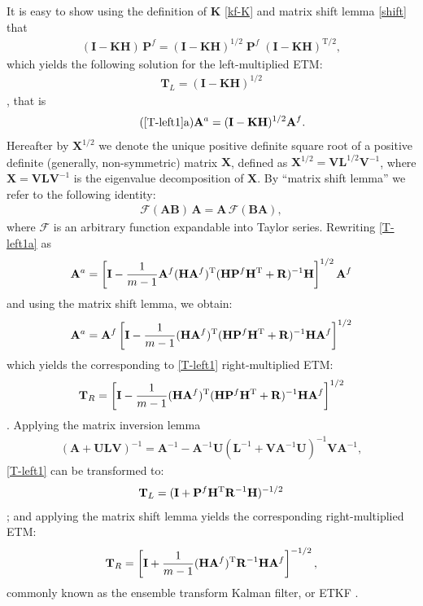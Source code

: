 \documentclass[11pt]{report}
\newcommand{\mb} {\mathbf}
\newcommand{\T}{^{\tiny \mathrm T}}
\newcommand{\TS}{^{{\mathrm T}/2}}
\begin{document}
It is easy to show using the definition of $\mb K$ \eqref{kf-K} and matrix shift lemma \eqref{shift} that 
\begin{align*}
    (\mb I - \mb K \mb H) \, \mb P^f = (\mb I - \mb K \mb H)^{1/2} \; \mb P^f \; (\mb I - \mb K \mb H)\TS,
\end{align*}
which yields the following solution for the left-multiplied ETM:
\begin{align}
  \label{T-left1}
  \mb T_L = (\mb I - \mb K \mb H)^{1/2}
\end{align}
\citep{sak08b}, that is
\begin{align}
  \tag{\ref{T-left1}a}
  \label{T-left1a}
  \mb A^a =  (\mb I - \mb K \mb H)^{1/2} \mb A^f.
\end{align}
Hereafter by $\mb X^{1/2}$ we denote the unique positive definite square root of a positive definite (generally, non-symmetric) matrix $\mb X$, defined as $\mb X^{1/2} = \mb V \mb L^{1/2} \mb V^{-1}$, where $\mb X = \mb V \mb L \mb V^{-1}$ is the eigenvalue decomposition of $\mb X$.
By ``matrix shift lemma'' we refer to the following identity:
\begin{align}
  \label{shift}
  \mathcal F(\mb A \mb B) \, \mb A = \mb A \, \mathcal F(\mb B \mb A),
\end{align}
where $\mathcal F$ is an arbitrary function expandable into Taylor series.
Rewriting \eqref{T-left1a} as
\begin{align*}
  \mb A^a = \left[ \mb I - \frac{1}{m-1} \mb A^f (\mb H \mb A^f)\T  (\mb H \mb P^f \mb H\T + \mb R)^{-1} \mb H \right]^{1/2} \mb A^f
\end{align*}
and using the matrix shift lemma, we obtain:
\begin{align*}
  \mb A^a = \mb A^f \left[ \mb I - \frac{1}{m-1} (\mb H \mb A^f)\T  (\mb H \mb P^f \mb H\T + \mb R)^{-1} \mb H \mb A^f \right]^{1/2}
\end{align*}
which yields the corresponding to \eqref{T-left1} right-multiplied ETM:
\begin{align}
  \label{T-right1}
  \mb T_R = \left[ \mb I -  \frac{1}{m-1} (\mb H \mb A^f)\T  (\mb H \mb P^f \mb H\T + \mb R)^{-1} \mb H \mb A^f \right]^{1/2}
\end{align}
\citep{eve04a}.
Applying the matrix inversion lemma
\begin{align}
  \label{inv}
  (\mb A + \mb U \mb L \mb V)^{-1} = \mb A^{-1} - \mb A^{-1} \mb U (\mb L^{-1} + \mb V \mb A^{-1} \mb U)^{-1} \mb V \mb A^{-1},
\end{align}
\eqref{T-left1} can be transformed to:
\begin{align}
  \label{T-left2}
  \mb T_L = (\mb I + \mb P^f \mb H\T \mb R^{-1} \mb H)^{-1/2}
\end{align}
\citep{sak11a}; and applying the matrix shift lemma yields the corresponding right-multiplied ETM:
\begin{align}
  \label{etkf}
  \mb T_R = \left[\mb I +  \frac{1}{m-1} (\mb H \mb A^f)\T \mb R^{-1} \mb H \mb A^f \right]^{-1/2},
\end{align}
commonly known as the ensemble transform Kalman filter, or ETKF \citep{bis01a}.
\end{document}
